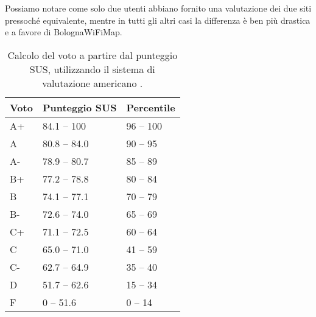 Possiamo notare come solo due utenti abbiano fornito una valutazione dei due siti pressoché equivalente, mentre in tutti gli altri casi la differenza è ben più drastica e a favore di BolognaWiFiMap.

\begin{center}
    \begin{table}[H]
        \centering
        \begin{tabularx}{\textwidth}{|X|X|X|}
            \hline
            \textbf{Voto} & \textbf{Punteggio SUS} & \textbf{Percentile} \\
            \hline
            A+  & 84.1 -- 100   & 96 -- 100 \\
            A   & 80.8 -- 84.0  & 90 -- 95  \\
            A-  & 78.9 -- 80.7  & 85 -- 89  \\
            B+  & 77.2 -- 78.8  & 80 -- 84  \\
            B   & 74.1 -- 77.1  & 70 -- 79  \\
            B-  & 72.6 -- 74.0  & 65 -- 69  \\
            C+  & 71.1 -- 72.5  & 60 -- 64  \\
            C   & 65.0 -- 71.0  & 41 -- 59  \\
            C-  & 62.7 -- 64.9  & 35 -- 40  \\
            D   & 51.7 -- 62.6  & 15 -- 34  \\
            F   & 0 -- 51.6     & 0 -- 14   \\
            \hline
        \end{tabularx}
        \caption[Calcolo del voto a partire dal punteggio SUS]{Calcolo del voto a partire dal punteggio SUS, utilizzando il sistema di valutazione americano \cite{SUS}.}
        \label{tab:sus_grading_system}
    \end{table}
\end{center}

